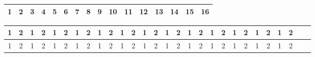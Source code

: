 \documentclass[36pt]{scrartcl}
\begin{document}
\renewcommand\arraystretch{1.25}
\renewcommand\tabcolsep{6pt}

\begin{table}

\begin{tabular}{|p{15cm}!{\vrule width 3pt}p{2cm}!{\vrule width 3pt}}
\hline
 & \\
\hline
\end{tabular}

\begin{tabular}{|c|c|c|c|c|c!{\vrule width 2pt}c|c|c|c|c|c|c|c|c|c|}
\hline
\bfseries \large 1 & \bfseries \large 2 & \bfseries \large 3 & \bfseries \large 4 & \bfseries \large 5 & \bfseries \large 6 & \bfseries \large 7 & \bfseries \large 8 & \bfseries \large 9 & \bfseries \large 10 & \bfseries \large 11 & \bfseries \large 12 & \bfseries \large 13 & \bfseries \large 14 & \bfseries \large 15 & \bfseries \large 16 \\
\hline
\end{tabular}

\begin{tabular}{|c|c!{\vrule width 2pt}c|c!{\vrule width 2pt}c|c!{\vrule width 2pt}c|c!{\vrule width 2pt}c|c!{\vrule width 2pt}c|c!{\vrule width 2pt}c|c!{\vrule width 2pt}c|c!{\vrule width 2pt}c|c!{\vrule width 2pt}c|c!{\vrule width 2pt}c|c!{\vrule width 2pt}c|c!{\vrule width 2pt}c|c!{\vrule width 2pt}c|c!{\vrule width 2pt}}


\hline
\footnotesize 1 & \footnotesize 2 & \footnotesize 1 & \footnotesize 2 & \footnotesize 1 & \footnotesize 2 & \footnotesize 1 & \footnotesize 2 & \footnotesize 1 & \footnotesize 2 & \footnotesize 1 & \footnotesize 2 & \footnotesize 1 & \footnotesize 2 & \footnotesize 1 & \footnotesize 2 & \footnotesize 1 & \footnotesize 2 & \footnotesize 1 & \footnotesize 2 & \footnotesize 1 & \footnotesize 2 & \footnotesize 1 & \footnotesize 2 & \footnotesize 1 & \footnotesize 2 \\
\hline

\hline
\footnotesize 1 & \footnotesize 2 & \footnotesize 1 & \footnotesize 2 & \footnotesize 1 & \footnotesize 2 & \footnotesize 1 & \footnotesize 2 & \footnotesize 1 & \footnotesize 2 & \footnotesize 1 & \footnotesize 2 & \footnotesize 1 & \footnotesize 2 & \footnotesize 1 & \footnotesize 2 & \footnotesize 1 & \footnotesize 2 & \footnotesize 1 & \footnotesize 2 & \footnotesize 1 & \footnotesize 2 & \footnotesize 1 & \footnotesize 2 & \footnotesize 1 & \footnotesize 2 \\
\hline


\end{tabular}
\end{table}
\end{document}
